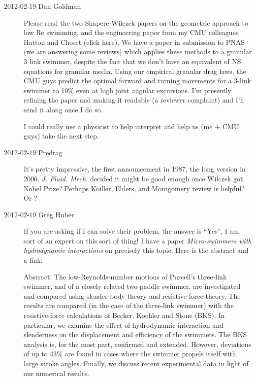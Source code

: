 \begin{description}

\item[2012-02-19 Dan Goldman]
Please read the two Shapere-Wilczek papers on the
geometric approach to low Re swimming, and the engineering paper from my
CMU colleagues Hatton and Choset (click
{here}). We have a paper in submission to PNAS (we are answering some
reviews) which applies these methods to a granular 3 link swimmer,
despite the fact that we don't have an equivalent of NS equations for
granular media. Using our empirical granular drag laws, the CMU guys
predict the optimal forward and turning movements for a 3-link swimmer to
10\% even at high joint angular excursions. I'm presently refining the
paper and making it readable (a reviewer complaint) and I'll send it
along once I do so.

I could really use a physicist to help interpret and help us (me + CMU
guys) take the next step.


\item[2012-02-19 Predrag] It's pretty impressive, the first
announcement in 1987, the long version in
2006. {\em J. Fluid. Mech.} decided it might be good enough once Wilczek
got Nobel Prize?
Perhaps Koiller, Ehlers, and Montgomery review is helpful?
Or ?

\item[2012-02-19 Greg Huber]
If you are asking if I can solve their problem, the answer is ``Yes'', I
am sort of an expert on this sort of thing! I have a paper
{\em Micro-swimmers with hydrodynamic interactions} on precisely this
topic. Here is the abstract and a
{link}:

Abstract:  The low-Reynolds-number motions of Purcell's three-link
swimmer, and of a closely related two-paddle swimmer, are investigated
and compared using slender-body theory and resistive-force theory. The
results are compared (in the case of the three-link swimmer) with the
resistive-force calculations of Becker, Koehler and Stone
(BKS). In particular, we examine the effect of hydrodynamic interaction
and slenderness on the displacement and efficiency of the swimmers. The
BKS analysis is, for the most part, confirmed and extended. However,
deviations of up to 43\% are found in cases where the swimmer propels
itself with large stroke angles. Finally, we discuss recent experimental
data in light of our numerical results.


\end{description}
